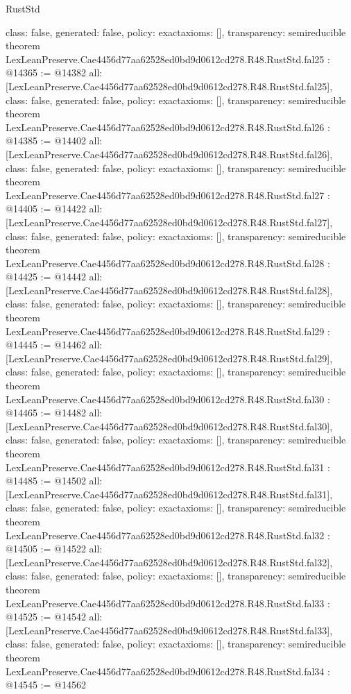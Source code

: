 \begin{lexlean}{RustStd}
\begin{coremodule}
{  class: false,
  generated: false,
  policy: exact{axioms: []},
  transparency: semireducible
}
theorem LexLeanPreserve.Cae4456d77aa62528ed0bd9d0612cd278.R48.RustStd.fal25 : @14365 := @14382 {
  all: [LexLeanPreserve.Cae4456d77aa62528ed0bd9d0612cd278.R48.RustStd.fal25],
  class: false,
  generated: false,
  policy: exact{axioms: []},
  transparency: semireducible
}
theorem LexLeanPreserve.Cae4456d77aa62528ed0bd9d0612cd278.R48.RustStd.fal26 : @14385 := @14402 {
  all: [LexLeanPreserve.Cae4456d77aa62528ed0bd9d0612cd278.R48.RustStd.fal26],
  class: false,
  generated: false,
  policy: exact{axioms: []},
  transparency: semireducible
}
theorem LexLeanPreserve.Cae4456d77aa62528ed0bd9d0612cd278.R48.RustStd.fal27 : @14405 := @14422 {
  all: [LexLeanPreserve.Cae4456d77aa62528ed0bd9d0612cd278.R48.RustStd.fal27],
  class: false,
  generated: false,
  policy: exact{axioms: []},
  transparency: semireducible
}
theorem LexLeanPreserve.Cae4456d77aa62528ed0bd9d0612cd278.R48.RustStd.fal28 : @14425 := @14442 {
  all: [LexLeanPreserve.Cae4456d77aa62528ed0bd9d0612cd278.R48.RustStd.fal28],
  class: false,
  generated: false,
  policy: exact{axioms: []},
  transparency: semireducible
}
theorem LexLeanPreserve.Cae4456d77aa62528ed0bd9d0612cd278.R48.RustStd.fal29 : @14445 := @14462 {
  all: [LexLeanPreserve.Cae4456d77aa62528ed0bd9d0612cd278.R48.RustStd.fal29],
  class: false,
  generated: false,
  policy: exact{axioms: []},
  transparency: semireducible
}
theorem LexLeanPreserve.Cae4456d77aa62528ed0bd9d0612cd278.R48.RustStd.fal30 : @14465 := @14482 {
  all: [LexLeanPreserve.Cae4456d77aa62528ed0bd9d0612cd278.R48.RustStd.fal30],
  class: false,
  generated: false,
  policy: exact{axioms: []},
  transparency: semireducible
}
theorem LexLeanPreserve.Cae4456d77aa62528ed0bd9d0612cd278.R48.RustStd.fal31 : @14485 := @14502 {
  all: [LexLeanPreserve.Cae4456d77aa62528ed0bd9d0612cd278.R48.RustStd.fal31],
  class: false,
  generated: false,
  policy: exact{axioms: []},
  transparency: semireducible
}
theorem LexLeanPreserve.Cae4456d77aa62528ed0bd9d0612cd278.R48.RustStd.fal32 : @14505 := @14522 {
  all: [LexLeanPreserve.Cae4456d77aa62528ed0bd9d0612cd278.R48.RustStd.fal32],
  class: false,
  generated: false,
  policy: exact{axioms: []},
  transparency: semireducible
}
theorem LexLeanPreserve.Cae4456d77aa62528ed0bd9d0612cd278.R48.RustStd.fal33 : @14525 := @14542 {
  all: [LexLeanPreserve.Cae4456d77aa62528ed0bd9d0612cd278.R48.RustStd.fal33],
  class: false,
  generated: false,
  policy: exact{axioms: []},
  transparency: semireducible
}
theorem LexLeanPreserve.Cae4456d77aa62528ed0bd9d0612cd278.R48.RustStd.fal34 : @14545 := @14562 {
}
\end{coremodule}
\end{lexlean}
